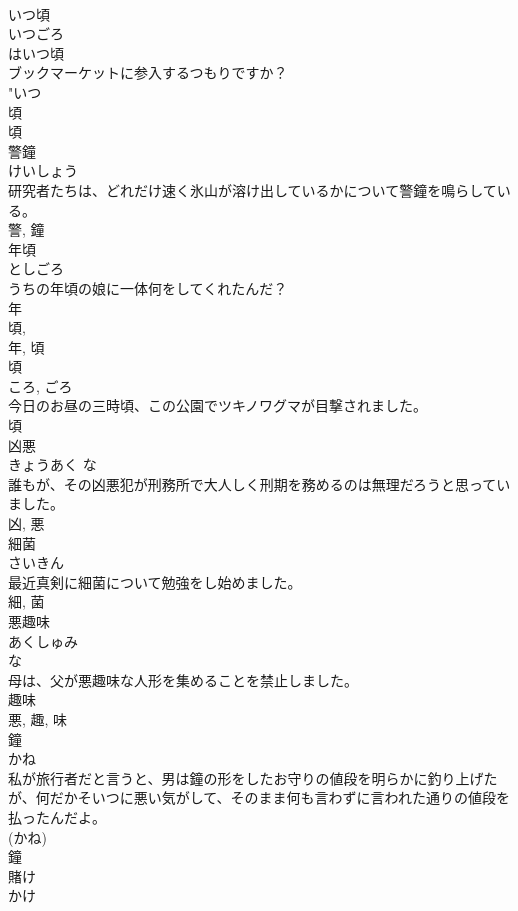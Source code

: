\documentclass[8pt]{extreport}
\begin{document}
\begin{CJK}{UTF8}{min}
\\	いつ頃	
\\	いつごろ	
\\	はいつ頃
\\	ブックマーケットに参入するつもりですか？	
\\	"いつ 
\\	頃 
\\	頃	
\\	警鐘	
\\	けいしょう	
\\	研究者たちは、どれだけ速く氷山が溶け出しているかについて警鐘を鳴らしている。	
\\	警, 鐘	
\\	年頃	
\\	としごろ	
\\	うちの年頃の娘に一体何をしてくれたんだ？	
\\	年 
\\	頃, 
\\	年, 頃	
\\	頃	
\\	ころ, ごろ	
\\	今日のお昼の三時頃、この公園でツキノワグマが目撃されました。	
\\	頃	
\\	凶悪	
\\	きょうあく	な 
\\	誰もが、その凶悪犯が刑務所で大人しく刑期を務めるのは無理だろうと思っていました。	
\\	凶, 悪	
\\	細菌	
\\	さいきん	
\\	最近真剣に細菌について勉強をし始めました。	
\\	細, 菌	
\\	悪趣味	
\\	あくしゅみ	
\\	な 
\\	母は、父が悪趣味な人形を集めることを禁止しました。	
\\	趣味 
\\	悪, 趣, 味	
\\	鐘	
\\	かね	
\\	私が旅行者だと言うと、男は鐘の形をしたお守りの値段を明らかに釣り上げたが、何だかそいつに悪い気がして、そのまま何も言わずに言われた通りの値段を払ったんだよ。	
\\	(かね) 
\\	鐘	
\\	賭け	
\\	かけ	

\end{CJK}
\end{document}
